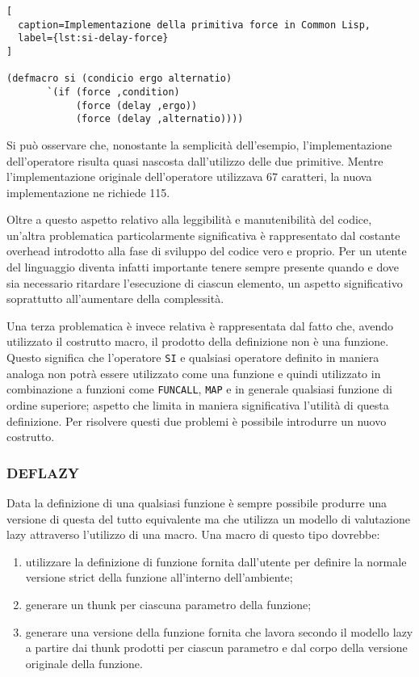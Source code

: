\begin{lstlisting}[
  caption=Implementazione della primitiva force in Common Lisp,
  label={lst:si-delay-force}
]

(defmacro si (condicio ergo alternatio)
       `(if (force ,condition)
            (force (delay ,ergo))
            (force (delay ,alternatio))))

\end{lstlisting}

Si può osservare che, nonostante la semplicità dell'esempio, l'implementazione
dell'operatore risulta quasi nascosta dall'utilizzo delle due primitive. Mentre
l'implementazione originale dell'operatore utilizzava 67 caratteri, la nuova
implementazione ne richiede 115.

Oltre a questo aspetto relativo alla leggibilità e manutenibilità del codice,
un'altra problematica particolarmente significativa è rappresentato dal costante
overhead introdotto alla fase di sviluppo del codice vero e proprio. Per un
utente del linguaggio diventa infatti importante tenere sempre presente quando e
dove sia necessario ritardare l'esecuzione di ciascun elemento, un aspetto
significativo soprattutto all'aumentare della complessità.

Una terza problematica è invece relativa è rappresentata dal fatto che, avendo
utilizzato il costrutto macro, il prodotto della definizione non è una funzione.
Questo significa che l'operatore \texttt{SI} e qualsiasi operatore definito in
maniera analoga non potrà essere utilizzato come una funzione e quindi
utilizzato in combinazione a funzioni come \texttt{FUNCALL}, \texttt{MAP} e in
generale qualsiasi funzione di ordine superiore; aspetto che limita in maniera
significativa l'utilità di questa definizione. Per risolvere questi due problemi
è possibile introdurre un nuovo costrutto.

\subsubsection{DEFLAZY}

Data la definizione di una qualsiasi funzione è sempre possibile produrre una
versione di questa del tutto equivalente ma che utilizza un modello di
valutazione lazy attraverso l'utilizzo di una macro. Una macro di questo tipo
dovrebbe:

\begin{enumerate}

\item utilizzare la definizione di funzione fornita dall'utente per definire la
normale versione strict della funzione all'interno dell'ambiente;

\item generare un thunk per ciascuna parametro della funzione;

\item generare una versione della funzione fornita che lavora secondo il modello
lazy a partire dai thunk prodotti per ciascun parametro e dal corpo della
versione originale della funzione.

\end{enumerate}

